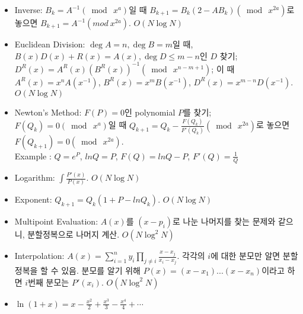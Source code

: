 \begin{itemize}
    \item Inverse: $B_k = A^{-1} (\bmod \ x^a)$일 때 $B_{k+1}=B_k (2-A B_k ) (\bmod \ x^{2a})$로 놓으면 $B_{k+1}=A^{-1} (mod \ x^{2a})$. $O(N\log N)$
    \item Euclidean Division: $\deg A = n, \deg B = m$일 때, $B(x)D(x)+R(x)=A(x), \deg D \le m - n$인 $D$ 찾기; $D^R(x) = A^R(x)(B^R(x))^{-1} (\bmod \ x^{n-m+1})$; 이 때 $A^R(x) = x^n A(x^{-1})$, $B^R(x) = x^m B(x^{-1})$, $D^R(x) = x^{m-n} D(x^{-1})$. $O(N \log N)$
    \item Newton's Method: $F(P)=0$인 polynomial $P$를 찾기; $F(Q_k)=0 (\bmod \ x^a )$일 때 $Q_{k+1}=Q_k - \frac{F(Q_k)}{F'(Q_k)} (\bmod \ x^{2a})$로 놓으면 $F(Q_{k+1})=0 (\bmod \ x^{2a})$. \\
    Example : $Q = e^P$, $ln Q = P$, $F(Q) = ln Q - P$, $F'(Q) = \frac{1}{Q}$
    \item Logarithm: $\int \frac{P'(x)}{P(x)}$. $O(N\log N)$
    \item Exponent: $Q_{k+1} = Q_k (1 + P - ln Q_k )$. $O(N\log N)$
    \item Multipoint Evaluation: $A(x)$를 $(x-p_i )$로 나눈 나머지를 찾는 문제와 같으니, 분할정복으로 나머지 계산. $O(N\log^2 N)$
    \item Interpolation: $A(x) = \sum_{i=1}^n{y_i \prod_{j\neq i}{\frac{x-x_j}{x_i - x_j}}}$. 각각의 $i$에 대한 분모만 알면 분할정복을 할 수 있음. 분모를 알기 위해 $P(x)=(x-x_1) ... (x-x_n)$이라고 하면 $i$번째 분모는 $P'(x_i)$. $O(N\log^2 N)$
    \item $\ln(1+x) = x-\frac{x^2}{2}+\frac{x^3}{3}-\frac{x^4}{4}+\cdots$
\end{itemize}